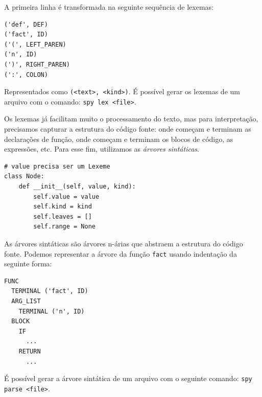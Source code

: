 A primeira linha é transformada na seguinte sequência de
lexemas:

\begin{lstlisting}
('def', DEF)
('fact', ID)
('(', LEFT_PAREN)
('n', ID)
(')', RIGHT_PAREN)
(':', COLON)
\end{lstlisting}

\noindent Representados como \verb|(<text>, <kind>)|.
É possível gerar os lexemas de um arquivo com o
comando: \verb|spy lex <file>|.

Os lexemas já facilitam muito o processamento do texto,
mas para interpretação, precisamos capturar a estrutura
do código fonte: onde começam e terminam
as declarações de função, onde começam e terminam
os blocos de código, as expressões, etc. Para esse fim, 
utilizamos as \textit{árvores sintáticas}.

\begin{lstlisting}
# value precisa ser um Lexeme
class Node:
    def __init__(self, value, kind):
        self.value = value
        self.kind = kind
        self.leaves = []
        self.range = None
\end{lstlisting}

As árvores sintáticas são árvores n-árias que abstraem a
estrutura do código fonte. Podemos representar a árvore
da função \verb|fact| usando indentação da seguinte forma:

\begin{lstlisting}
FUNC
  TERMINAL ('fact', ID)
  ARG_LIST
    TERMINAL ('n', ID)
  BLOCK
    IF
      ...
    RETURN
      ...
\end{lstlisting}

É possível gerar a árvore sintática de um arquivo
com o seguinte comando: \verb|spy parse <file>|.